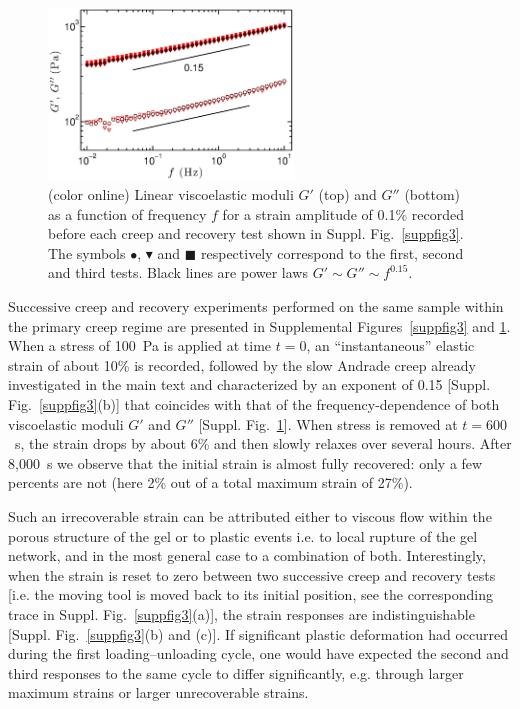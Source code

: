 \documentclass[twocolumn,superscriptaddress,showpacs,preprintnumbers,amsmath,amssymb,prl]{revtex4}
\begin{document}
\begin{figure}
\centering
\includegraphics[width=6.5cm,clip]{SuppFig4.eps}
\caption{(color online) Linear viscoelastic moduli $G'$ (top) and $G''$ (bottom) as a function of frequency $f$ for a strain amplitude of 0.1\% recorded before each creep and recovery test shown in Suppl. Fig.~\ref{suppfig3}. The symbols \textcolor{red!25!black}{$\bullet$}, \textcolor{red!50!black}{$\blacktriangledown$} and \textcolor{red!75!black}{$\blacksquare$} respectively correspond to the first, second and third tests. Black lines are power laws $G'\sim G''\sim f^{0.15}$. 
\label{suppfig4}}
\end{figure} 

Successive creep and recovery experiments performed on the same sample within the primary creep regime are presented in Supplemental Figures~\ref{suppfig3} and \ref{suppfig4}. When a stress of 100~Pa is applied at time $t=0$, an ``instantaneous'' elastic strain of about 10\% is recorded, followed by the slow Andrade creep already investigated in the main text and characterized by an exponent of 0.15 [Suppl. Fig.~\ref{suppfig3}(b)] that coincides with that of the frequency-dependence of both viscoelastic moduli $G'$ and $G''$ [Suppl. Fig.~\ref{suppfig4}]. When stress is removed at $t=600$~s, the strain drops by about 6\% and then slowly relaxes over several hours. After 8,000~s we observe that the initial strain is almost fully recovered: only a few percents are not (here 2\% out of a total maximum strain of 27\%).

Such an irrecoverable strain can be attributed either to viscous flow within the porous structure of the gel or to plastic events i.e. to local rupture of the gel network, and in the most general case to a combination of both. Interestingly, when the strain is reset to zero between two successive creep and recovery tests [i.e. the moving tool is moved back to its initial position, see the corresponding trace in Suppl. Fig.~\ref{suppfig3}(a)], the strain responses are indistinguishable [Suppl. Fig.~\ref{suppfig3}(b) and (c)]. If significant plastic deformation had occurred during the first loading--unloading cycle, one would have expected the second and third responses to the same cycle to differ significantly, e.g. through larger maximum strains or larger unrecoverable strains.
\end{document}
